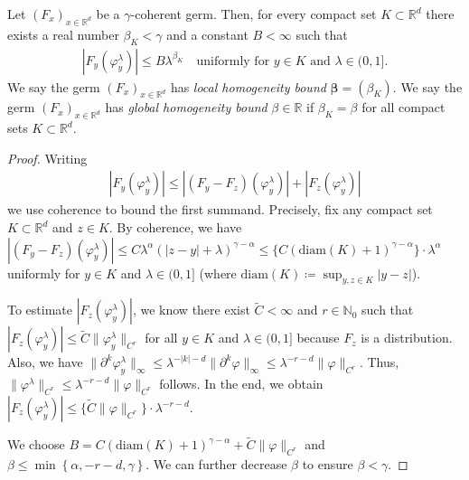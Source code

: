 \begin{lemma}\label{lemma:homogeneity-bound}
   Let \({(F_x)}_{x \in \mathbb{R}^d}\) be a \(\gamma\)-coherent germ. Then, for every compact set \(K \subset \mathbb{R}^d\) there exists a real number \(\beta_K < \gamma\) and a constant \(B < \infty\) such that
   \begin{gather*}\label{homogeneity}
                |F_y(\varphi^\lambda_y)| \leq B\lambda^{\beta_K} \quad
                \text{uniformly for \(y \in K\) and \(\lambda \in (0,1]\)}. %
   \end{gather*}
   We say the germ \({(F_x)}_{x \in \mathbb{R}^d}\) has \emph{local homogeneity bound} \(\bm \beta = (\beta_K)\). We say the germ \({(F_x)}_{x \in \mathbb{R}^d}\) has \emph{global homogeneity bound} \(\beta \in \mathbb{R}\) if \(\beta_K = \beta\) for all compact sets \(K \subset \mathbb{R}^d\).
\end{lemma}

\begin{proof}
    Writing
    \begin{align*}
        |F_y(\varphi^\lambda_y)| \leq |(F_y - F_z)(\varphi^\lambda_y)| + |F_z(\varphi^\lambda_y)|
    \end{align*}
    we use coherence to bound the first summand. Precisely, fix any compact set \(K \subset \mathbb{R}^d\) and \(z \in K\). By coherence, we have \(|(F_y - F_z)(\varphi^\lambda_y)| \leq  C \lambda^{\alpha}(|z-y|+\lambda)^{\gamma - \alpha} \leq \{ C (\mathrm{diam}(K) + 1)^{\gamma - \alpha} \} \cdot  \lambda^{\alpha}\) uniformly for \(y \in K\) and \(\lambda \in (0,1]\) (where \(\mathrm{diam}(K) \coloneqq \sup_{y,z \in K}|y-z| \)). %

    To estimate \(|F_z(\varphi^\lambda_y)|\), we know there exist \(\tilde C < \infty\) and \(r \in \mathbb{N}_0\) such that \(|F_z(\varphi^\lambda_y)| \leq \tilde C \lVert \varphi^\lambda_y \rVert_{C^r}\) for all \(y \in K\) and \(\lambda \in (0,1]\) because \(F_z\) is a distribution. Also, we have \(\lVert \partial^k\varphi^\lambda_y \rVert_\infty \leq \lambda^{-|k|- d} \lVert \partial^k\varphi \rVert_\infty \leq \lambda^{-r - d} \lVert \varphi \rVert_{C^r}\). Thus, \(\lVert \varphi^\lambda \rVert_{C^r} \leq \lambda^{-r-d}\lVert \varphi \rVert_{C^r}\) follows. In the end, we obtain 
    \(|F_z(\varphi^\lambda_y)| \leq \{ \tilde C  \lVert \varphi \rVert_{C^r}  \} \cdot \lambda^{-r-d}\).

    We choose \(B = C {(\mathrm{diam}(K) + 1)}^{\gamma - \alpha} +  \tilde C  \lVert \varphi \rVert_{C^r}  \) and \(\beta \leq \min \left\{ \alpha, -r-d, \gamma \right\}\). We can further decrease \( \beta \) to ensure \( \beta < \gamma \).
\end{proof}

